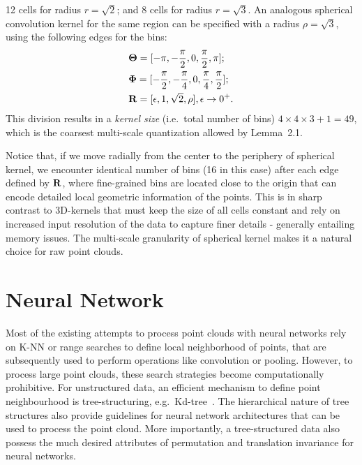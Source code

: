 \documentclass[10pt,twocolumn,letterpaper]{article}
\begin{document}
  12 cells for radius $r=\sqrt{2}$; and 8 cells for radius $r=\sqrt{3}$.
An analogous spherical convolution kernel for the same region can be specified with a radius $\rho=\sqrt{3}$, using the following edges for the bins:
 \begin{align}\label{split-sphConv}
 \notag
 &\boldsymbol{\Theta}=[-\pi,-\frac{\pi}{2},0,\frac{\pi}{2},\pi];\\
 \notag
&\boldsymbol{\Phi} =[-\frac{\pi}{2},-\frac{\pi}{4},0,\frac{\pi}{4},\frac{\pi}{2}];\\
&\bold{R} = [\epsilon,1,\sqrt{2},\rho], \epsilon\rightarrow0^+.
  \end{align}
  This division results in a \emph{kernel size} (i.e.~total number of bins) $4\times 4\times 3 + 1=49$, which is the coarsest multi-scale quantization allowed by Lemma~2.1. 

Notice that, if we move radially from the center to the periphery of  spherical kernel, we encounter identical number of bins (16 in this case) after each edge defined by  $\bold{R}$, where fine-grained bins are located close to the origin that can encode detailed local geometric information of the points. This is in sharp contrast to 3D-kernels that  must keep the size of all cells constant and rely on increased input resolution of the data to capture  finer details - generally entailing memory issues.
The multi-scale granularity of spherical kernel makes it a natural choice for raw point clouds. \vspace{-1mm}
\section{Neural Network}
\vspace{-2mm}
Most of the existing attempts to  process point clouds with neural networks  \cite{li2018so,li2018pointcnn,qi2017pointnetplusplus,shen2018mining,simonovsky2017dynamic}  rely on K-NN  or range searches to define local neighborhood of points, that are  subsequently used  to perform  operations like convolution or pooling. However, to process large point clouds, these search strategies become computationally prohibitive.   For unstructured data, an efficient mechanism to define point neighbourhood  is tree-structuring, e.g.~Kd-tree~\cite{bentley1975multidimensional}.  The hierarchical nature of tree structures also provide guidelines for  neural network architectures that can be used to process the point cloud. More importantly, a tree-structured data also possess
the much desired attributes of permutation and translation invariance for  neural networks.
\end{document}
